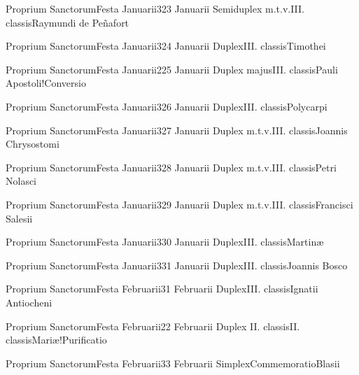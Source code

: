 \documentclass[psalterium-feriale.tex]{subfiles}
\begin{document}
	{Proprium Sanctorum}{Festa Januarii}{3}{23 Januarii}
	{Semiduplex m.t.v.}{III. classis}{Raymundi de Peñafort}
	{}
	{}
\COPOaRubric

	{Proprium Sanctorum}{Festa Januarii}{3}{24 Januarii}
	{Duplex}{III. classis}{Timothei}
	{}
	{}
\UMEXbRubric

	{Proprium Sanctorum}{Festa Januarii}{2}{25 Januarii}
	{Duplex majus}{III. classis}{Pauli Apostoli!Conversio}
	{}
	{}
\psalmodiapropria

	{Proprium Sanctorum}{Festa Januarii}{3}{26 Januarii}
	{Duplex}{III. classis}{Polycarpi}
	{}
	{}
\UMEXbRubric

	{Proprium Sanctorum}{Festa Januarii}{3}{27 Januarii}
	{Duplex m.t.v.}{III. classis}{Joannis Chrysostomi}
	{}
	{}
\COPOcRubric

	{Proprium Sanctorum}{Festa Januarii}{3}{28 Januarii}
	{Duplex m.t.v.}{III. classis}{Petri Nolasci}
	{}
	{}
\COPObRubric

	{Proprium Sanctorum}{Festa Januarii}{3}{29 Januarii}
	{Duplex m.t.v.}{III. classis}{Francisci Salesii}
	{}
	{}
\COPOcRubric

	{Proprium Sanctorum}{Festa Januarii}{3}{30 Januarii}
	{Duplex}{III. classis}{Martinæ}
	{}
	{}

	{Proprium Sanctorum}{Festa Januarii}{3}{31 Januarii}
	{Duplex}{III. classis}{Joannis Bosco}
	{}
	{}
\COPObRubric

	{Proprium Sanctorum}{Festa Februarii}{3}{1 Februarii}
	{Duplex}{III. classis}{Ignatii Antiocheni}
	{}
	{}
\UMEXbRubric

	{Proprium Sanctorum}{Festa Februarii}{2}{2 Februarii}
	{Duplex II. classis}{II. classis}{Mariæ!Purificatio}
	{}
	{}
\psalmodiapropria

	{Proprium Sanctorum}{Festa Februarii}{3}{3 Februarii}
	{Simplex}{Commemoratio}{Blasii}
	{}
	{}
\UMEXaRubric
\end{document}

